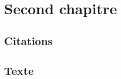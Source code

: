 \chapter{Second chapitre}

\minitoc

\section{Citations}


\lipsum[13-16]

\section{Texte}

\lipsum[17-21]

